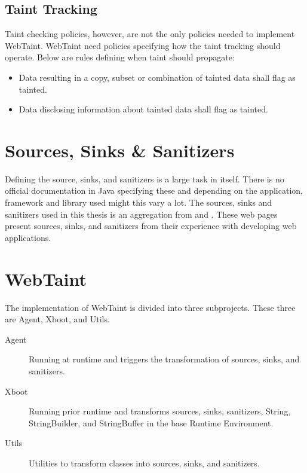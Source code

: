 \subsection{Taint Tracking}
Taint checking policies, however, are not the only policies needed to implement WebTaint. WebTaint need policies specifying how the taint tracking should operate. Below are rules defining when taint should propagate:

\hfill
\begin{itemize}
    \item Data resulting in a copy, subset or combination of tainted data shall flag as tainted.
    \item Data disclosing information about tainted data shall flag as tainted.
\end{itemize}
\hfill



\section{Sources, Sinks \& Sanitizers}
\label{souresSS}
Defining the source, sinks, and sanitizers is a large task in itself. There is no official documentation in Java specifying these and depending on the application, framework and library used might this vary a lot.  The sources, sinks and sanitizers used in this thesis is an aggregation from \textcite{sssCodeMaster} and \textcite{sssOWASP}. These web pages present sources, sinks, and sanitizers from their experience with developing web applications. 



\section{WebTaint}
\label{SoftwareArchitecture}
The implementation of WebTaint is divided into three subprojects. These three are Agent, Xboot, and Utils. 

\hfill
\begin{description}
    \item[Agent] Running at runtime and triggers the transformation of sources, sinks, and sanitizers.
    \item[Xboot] Running prior runtime and transforms sources, sinks, sanitizers, String, StringBuilder, and StringBuffer in the base Runtime Environment.
    \item[Utils] Utilities to transform classes into sources, sinks, and sanitizers. 
\end{description}
\hfill

